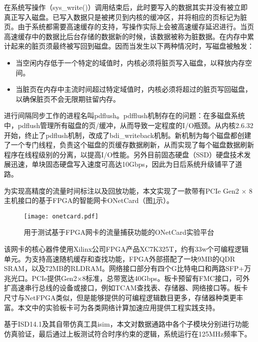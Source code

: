 在系统写操作（sys\_write()）调用结束后，此时要写入的数据其实并没有被立即真正写入磁盘。已写入数据只是被拷贝到内核的缓冲区，并将相应的页标记为脏页。由于系统都需要高速缓存的支持，写操作实际上会被高速缓存延迟进行。当页高速缓存中的数据比后台存储的数据新的时候，该数据被称为脏数据。在内存中累计起来的脏页须最终被写回到磁盘。因而当发生以下两种情况时，写磁盘被触发：

\begin{itemize}
	\item 当空闲内存低于一个特定的域值时，内核必须将脏页写入磁盘，以释放内存空间。
	\item 当脏页在内存中主流时间超过特定域值时，内核必须将超过的脏页写回磁盘，以确保脏页不会无限期驻留内存。
\end{itemize}

进行间隔同步工作的进程名叫pdflush。pdfflush机制存在的问题：在多磁盘系统中，pdflush管理所有磁盘的页/缓冲，从而导致一定程度的I/O瓶颈。从内核2.6.32开始，终止了pdflush机制，改成了bdi\_writeback机制。新机制为每个磁盘都创建了一个专门线程，负责这个磁盘的页缓存数据刷新，从而实现了每个磁盘数据刷新程序在线程级别的分离，以提高I/O性能。另外目前固态硬盘（SSD）硬盘技术发展迅速，单块固态硬盘写入速度可高达10Gbps，因此为日后系统升级铺平了道路。


为实现高精度的流量时间标注以及回放功能，本文实现了一款带有PCIe Gen2 $ \times $ 8主机接口的基于FPGA的智能网卡ONetCard（图\ref{fig:onetcard}示）。

\begin{figure}[!ht]
	\centering
	\texttt{[image: onetcard.pdf]}
	\caption{用于测试基于FPGA网卡的流量捕获功能的ONetCard实验平台} \label{fig:onetcard}
\end{figure}

该网卡的核心器件使用Xilinx公司FPGA产品XC7K325T，约有33w个可编程逻辑单元。为支持高速随机缓存和查找功能，FPGA外部搭配了一块9MB的QDR SRAM，以及72MB的RLDRAM。网络接口部分有四个G比特电口和两路SFP+万兆光口。PCIe提供Gen2$\times$8标准，总带宽达40Gbps。板卡预留有FMC接口，可外扩高速串行总线的设备或接口，例如TCAM查找表、存储器、网络接口等。板卡尺寸与NetFPGA类似，但是能够提供的可编程逻辑数目更多，存储器种类更丰富。本文中的实验板卡可为各类网络计算加速应用提供工程实践支持。



基于ISD14.1及其自带仿真工具isim，本文对数据通路中各个子模块分别进行功能仿真验证，最后通过上板测试符合时序约束的逻辑，系统运行在125MHz频率下。

